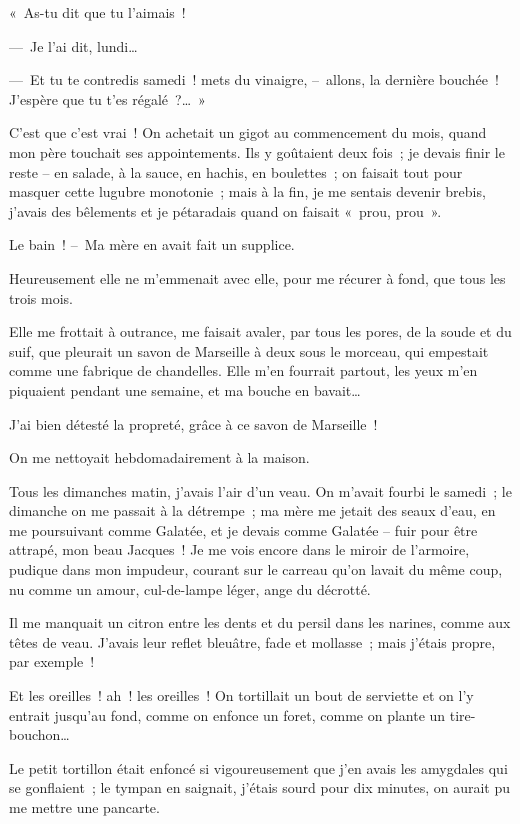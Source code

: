 \documentclass[french,twoside]{book} %
\begin{document}
« As-tu dit que tu l’aimais !\par
— Je l’ai dit, lundi…\par
— Et tu te contredis samedi ! mets du vinaigre, – allons, la dernière bouchée ! J’espère que tu t’es régalé ?… »\par
\bigbreak
\noindent C’est que c’est vrai ! On achetait un gigot au commencement du mois, quand mon père touchait ses appointements. Ils y goûtaient deux fois ; je devais finir le reste – en salade, à la sauce, en hachis, en boulettes ; on faisait tout pour masquer cette lugubre monotonie ; mais à la fin, je me sentais devenir brebis, j’avais des bêlements et je pétaradais quand on faisait « prou, prou ».\par
\bigbreak
\noindent Le bain ! – Ma mère en avait fait un supplice.\par
Heureusement elle ne m’emmenait avec elle, pour me récurer à fond, que tous les trois mois.\par
Elle me frottait à outrance, me faisait avaler, par tous les pores, de la soude et du suif, que pleurait un savon de Marseille à deux sous le morceau, qui empestait comme une fabrique de chandelles. Elle m’en fourrait partout, les yeux m’en piquaient pendant une semaine, et ma bouche en bavait…\par
J’ai bien détesté la propreté, grâce à ce savon de Marseille !\par
\bigbreak
\noindent On me nettoyait hebdomadairement à la maison.\par
Tous les dimanches matin, j’avais l’air d’un veau. On m’avait fourbi le samedi ; le dimanche on me passait à la détrempe ; ma mère me jetait des seaux d’eau, en me poursuivant comme Galatée, et je devais comme Galatée – fuir pour être attrapé, mon beau Jacques ! Je me vois encore dans le miroir de l’armoire, pudique dans mon impudeur, courant sur le carreau qu’on lavait du même coup, nu comme un amour, cul-de-lampe léger, ange du décrotté.\par
Il me manquait un citron entre les dents et du persil dans les narines, comme aux têtes de veau. J’avais leur reflet bleuâtre, fade et mollasse ; mais j’étais propre, par exemple !\par
\bigbreak
\noindent Et les oreilles ! ah ! les oreilles ! On tortillait un bout de serviette et on l’y entrait jusqu’au fond, comme on enfonce un foret, comme on plante un tire-bouchon…\par
Le petit tortillon était enfoncé si vigoureusement que j’en avais les amygdales qui se gonflaient ; le tympan en saignait, j’étais sourd pour dix minutes, on aurait pu me mettre une pancarte.\par
\end{document}
